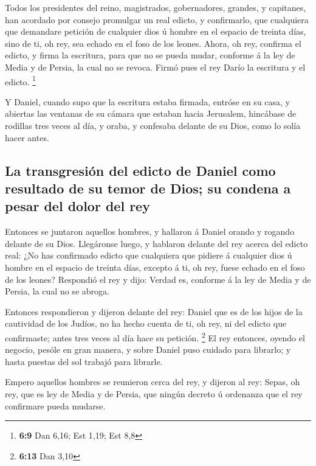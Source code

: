  Todos los presidentes del reino, magistrados,
gobernadores, grandes, y capitanes, han acordado por consejo promulgar
un real edicto, y confirmarlo, que cualquiera que demandare petición de
cualquier dios ú hombre en el espacio de treinta días, sino de ti, oh
rey, sea echado en el foso de los leones.  Ahora, oh rey,
confirma el edicto, y firma la escritura, para que no se pueda mudar,
conforme á la ley de Media y de Persia, la cual no se revoca.
 Firmó pues el rey Darío la escritura y el edicto.
\footnote{\textbf{6:9} Dan 6,16; Est 1,19; Est 8,8}

 Y Daniel, cuando supo que la escritura estaba firmada,
entróse en su casa, y abiertas las ventanas de su cámara que estaban
hacia Jerusalem, hincábase de rodillas tres veces al día, y oraba, y
confesaba delante de su Dios, como lo solía hacer antes.

\hypertarget{la-transgresiuxf3n-del-edicto-de-daniel-como-resultado-de-su-temor-de-dios-su-condena-a-pesar-del-dolor-del-rey}{%
\subsection{La transgresión del edicto de Daniel como resultado de su
temor de Dios; su condena a pesar del dolor del
rey}\label{la-transgresiuxf3n-del-edicto-de-daniel-como-resultado-de-su-temor-de-dios-su-condena-a-pesar-del-dolor-del-rey}}

 Entonces se juntaron aquellos hombres, y hallaron á
Daniel orando y rogando delante de su Dios.  Llegáronse
luego, y hablaron delante del rey acerca del edicto real: ¿No has
confirmado edicto que cualquiera que pidiere á cualquier dios ú hombre
en el espacio de treinta días, excepto á ti, oh rey, fuese echado en el
foso de los leones? Respondió el rey y dijo: Verdad es, conforme á la
ley de Media y de Persia, la cual no se abroga.

 Entonces respondieron y dijeron delante del rey: Daniel
que es de los hijos de la cautividad de los Judíos, no ha hecho cuenta
de ti, oh rey, ni del edicto que confirmaste; antes tres veces al día
hace su petición. \footnote{\textbf{6:13} Dan 3,10}  El
rey entonces, oyendo el negocio, pesóle en gran manera, y sobre Daniel
puso cuidado para librarlo; y hasta puestas del sol trabajó para
librarle.

 Empero aquellos hombres se reunieron cerca del rey, y
dijeron al rey: Sepas, oh rey, que es ley de Media y de Persia, que
ningún decreto ú ordenanza que el rey confirmare pueda mudarse.

